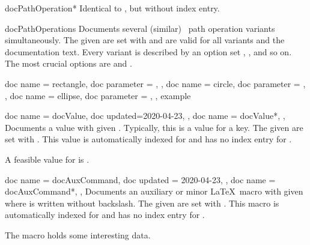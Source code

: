 \begin{docEnvironment}[doclang/environment content=command description,
    doc new and updated={2019-09-18}{2020-04-22}]{docPathOperation*}{}
  Identical to , but without index entry.
\end{docEnvironment}


\begin{docEnvironment}[doclang/environment content=command description,
    doc new={2020-04-22}]{docPathOperations}{}
  Documents several (similar) \tikzname\ path operation variants simultaneously.
  The given  are set with  and are valid for
  all variants and the documentation text.
  Every variant is described by an option set , , and so on.
  The most crucial options are  and .
\begin{dispExample}
\begin{docPathOperations}
  {
    {
      doc name      = rectangle,
      doc parameter = ,
    },
    {
      doc name      = circle,
      doc parameter = ,
    },
    {
      doc name      = ellipse,
      doc parameter = ,
    },
  }
  example
\end{docPathOperations}
\end{dispExample}
\end{docEnvironment}


\clearpage
\begin{docCommands}[doc parameter=\oarg{options}\marg{name}]
  {
    {
      doc name = docValue,
      doc updated=2020-04-23,
    },
    {
      doc name = docValue*,
    },
  }
  Documents a value with given . Typically, this is a value for a key.
  The given  are set with .
  This value is automatically indexed for 
  and has no index entry for .
\begin{dispExample}
A feasible value for  is .
\end{dispExample}
\end{docCommands}



\begin{docCommands}[doc parameter=\oarg{options}\marg{name}]
  {
    {
      doc name    = docAuxCommand,
      doc updated = 2020-04-23,
    },
    {
      doc name = docAuxCommand*,
    },
  }
  Documents an auxiliary or minor \LaTeX\ macro with given 
  where  is written without backslash.
  The given  are set with .
  This macro is automatically indexed for 
  and has no index entry for .
\begin{dispExample}
The macro  holds some interesting data.
\end{dispExample}
\end{docCommands}




